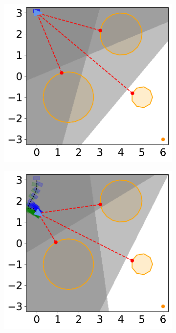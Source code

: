 \begin{figure}[H]
    \centering
    \begin{subfigure}{0.35\textwidth}
        \centering
        \includegraphics[width=\textwidth]{figures/Simulations/sim1circles_delta/frame_0.pdf}
    \end{subfigure}%
    \hspace{1em}
    \begin{subfigure}{0.35\textwidth}
        \centering
        \includegraphics[width=\textwidth]{figures/Simulations/sim1circles_delta/frame_1.pdf}
    \end{subfigure}%


\end{figure}
